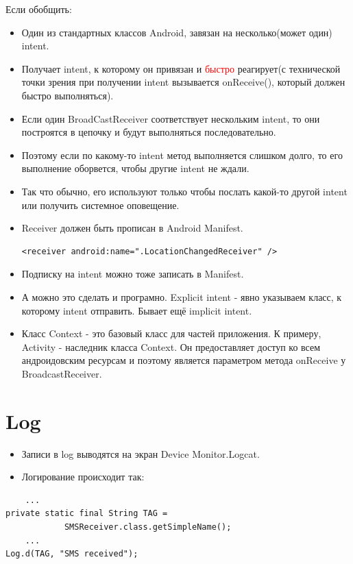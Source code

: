 \documentclass[12 pt]{article}
\begin{document}
    Если обобщить:
    \begin{itemize}
        \item Один из стандартных классов Android, завязан на несколько(может один) intent. 
	    \item Получает intent, к которому он привязан и \textcolor{red}{быстро} реагирует(с технической точки зрения при получении intent вызывается onReceive(), который должен быстро выполняться).
		\item Если один BroadCastReceiver соответствует нескольким intent, то они построятся в цепочку и будут выполняться последовательно.
		\item Поэтому если по какому-то intent метод выполняется слишком долго, то его выполнение оборвется, чтобы другие intent не ждали.
		\item Так что обычно, его используют только чтобы послать какой-то другой intent или получить системное оповещение.
 		\item Receiver должен быть прописан в Android Manifest.
        \begin{lstlisting}
<receiver android:name=".LocationChangedReceiver" />
        \end{lstlisting}		    
 	    \item Подписку на intent можно тоже записать в Manifest.
        \item А можно это сделать и програмно. Explicit intent - явно указываем класс, к которому intent отправить. Бывает ещё implicit intent.  
        \item Класс Context - это базовый класс для частей приложения. К примеру, Activity - наследник класса Context. Он предоставляет доступ ко всем андроидовским ресурсам и поэтому является параметром метода onReceive у BroadcastReceiver.
    \end{itemize}

\section{Log}     
    \begin{itemize}
        \item Записи в log выводятся на экран Device Monitor.Logcat.
        \item Логирование происходит так:
    \end{itemize}
    \begin{lstlisting}
    ...
private static final String TAG = 
            SMSReceiver.class.getSimpleName();
    ...
Log.d(TAG, "SMS received");    
    \end{lstlisting}
\end{document}
